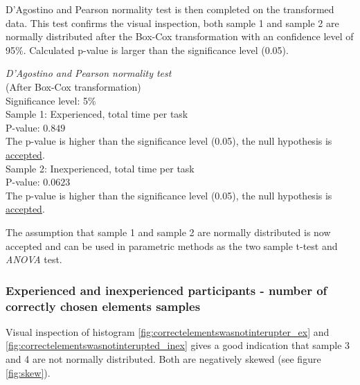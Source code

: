 D'Agostino and Pearson normality test is then completed on the transformed data. This test confirms the visual inspection, both sample 1 and sample 2 are normally distributed after the Box-Cox transformation with an confidence level of 95\%. Calculated p-value is larger than the significance level (0.05). \\[0.5cm] 

\begin{center}
	\begin{tcolorbox}[box align=center,width=\textwidth-5cm]
		\centering
		\textit{D'Agostino and Pearson normality test}\\
		(After Box-Cox transformation) \\
		Significance level: 5\%  \\[0.5cm]
		
		Sample 1: Experienced, total time per task\\
		P-value: $0.849$\\
		The p-value is higher than the significance level (0.05), the null hypothesis is \underline{accepted}. \\[0.5cm]
		
		Sample 2: Inexperienced, total time per task \\ %
		P-value: $0.0623$ \\
		The p-value is higher than the significance level (0.05), the null hypothesis is \underline{accepted}. \\[0.5cm]
	\end{tcolorbox}
\end{center}

The assumption that sample 1 and sample 2 are normally distributed is now accepted and can be used in parametric methods as the two sample t-test and \textit{ANOVA} test.

\subsubsection[Sample 3 and 4]{Experienced and inexperienced participants - number of correctly chosen elements samples}\label{sec:correct_ex_inex}
Visual inspection of histogram \ref{fig:correctelementswasnotinterupter_ex} and \ref{fig:correctelementswasnotinterupted_inex} gives a good indication that sample 3 and 4 are not normally distributed. Both are negatively skewed (see figure \ref{fig:skew}).   

